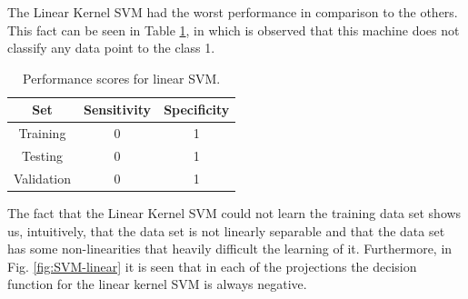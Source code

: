The Linear Kernel SVM had the worst performance in comparison to the others.
This fact can be seen in Table \ref{tab:linear_SVM}, in which is observed that
this machine does not classify any data point to the class 1.

\begin{table}
  \centering
  \caption{Performance scores for linear SVM.}
  \label{tab:linear_SVM}
  \begin{tabular}{ccc}
    \hline
    \textbf{Set} & \textbf{Sensitivity} & \textbf{Specificity} \\ \hline
    Training & 0 & 1 \\
    Testing & 0 & 1 \\
    Validation & 0 & 1 \\ \hline
  \end{tabular}
\end{table}

The fact that the Linear Kernel SVM could not learn the training data set shows
us, intuitively, that the data set is not linearly separable and that the data
set has some non-linearities that heavily difficult the learning of it.
Furthermore, in Fig. \ref{fig:SVM-linear} it is seen that in each of the
projections the decision function for the linear kernel SVM is always negative.


